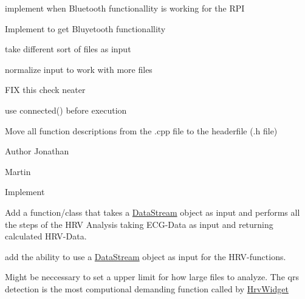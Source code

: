 
\begin{DoxyRefList}
\item[\label{todo__todo000021}%
\hypertarget{todo__todo000021}{}%
Member \hyperlink{classBluetoothMenu_a0fd16ad5a39ce3624613ad7834a55565}{Bluetooth\+Menu\+:\+:new\+Menu} ()]implement when Bluetooth functionallity is working for the R\+PI 

Implement to get Bluyetooth functionallity  
\item[\label{todo__todo000003}%
\hypertarget{todo__todo000003}{}%
Class \hyperlink{classConvertEcgToIbi}{Convert\+Ecg\+To\+Ibi} ]take different sort of files as input 
\item[\label{todo__todo000001}%
\hypertarget{todo__todo000001}{}%
Member \hyperlink{classConvertEcgToIbi_a3d9ea57ed19352295382095febc82f71}{Convert\+Ecg\+To\+Ibi\+:\+:run} ()]normalize input to work with more files 

F\+IX this check neater  
\item[\label{todo__todo000009}%
\hypertarget{todo__todo000009}{}%
Member \hyperlink{classDeviceManager_a8569742b2eb08d95052506e372b6bd31}{Device\+Manager\+:\+:stop} ()]use connected() before execution  
\item[\label{todo__todo000011}%
\hypertarget{todo__todo000011}{}%
Class \hyperlink{classEcgCapture}{Ecg\+Capture} ]Move all function descriptions from the .cpp file to the headerfile (.h file) \begin{DoxyAuthor}{Author}
Jonathan 

Martin  
\end{DoxyAuthor}

\item[\label{todo__todo000012}%
\hypertarget{todo__todo000012}{}%
Member \hyperlink{group__Device-Facade_ga8fef74cdd0296256ab4a700dae2d02a4}{Ecg\+Capture\+:\+:stop} ()]Implement 
\item[\label{todo__todo000013}%
\hypertarget{todo__todo000013}{}%
Module \hyperlink{group__HRV-Analysis}{H\+R\+V-\/\+Analysis} ]Add a function/class that takes a \hyperlink{classDataStream}{Data\+Stream} object as input and performs all the steps of the H\+RV Analysis taking E\+C\+G-\/\+Data as input and returning calculated H\+R\+V-\/\+Data.  
\item[\label{todo__todo000014}%
\hypertarget{todo__todo000014}{}%
File \hyperlink{hrvanalysis_8h}{hrvanalysis.h} ]add the ability to use a \hyperlink{classDataStream}{Data\+Stream} object as input for the H\+R\+V-\/functions.  
\item[\label{todo__todo000017}%
\hypertarget{todo__todo000017}{}%
Class \hyperlink{classHrvWidget}{Hrv\+Widget} ]Might be neccessary to set a upper limit for how large files to analyze. The qrs detection is the most computional demanding function called by \hyperlink{classHrvWidget}{Hrv\+Widget} 


\end{DoxyRefList}
